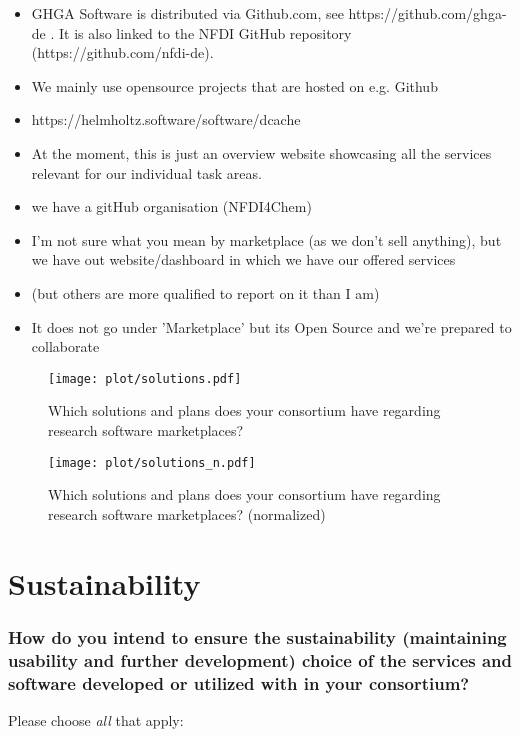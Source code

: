 \documentclass[headsepline,titlepage,twoside,12pt,toc=flat,headings=normal]{scrreprt}
\newcommand{\question}[1]{\subsubsection{#1}}
\begin{document}
\begin{itemize}
\item GHGA Software is distributed via Github.com, see https://github.com/ghga-de . It is also linked to the NFDI GitHub repository (https://github.com/nfdi-de).
\item We mainly use opensource projects that are hosted on e.g. Github
\item https://helmholtz.software/software/dcache
\item At the moment, this is just an overview website showcasing all the services relevant for our individual task areas.
\item we have a gitHub organisation (NFDI4Chem)
\item I'm not sure what you mean by marketplace (as we don't sell anything), but we have out website/dashboard in which we have our offered services
\item (but others are more qualified to report on it than I am)
\item It does not go under 'Marketplace' but its Open Source and we're prepared to collaborate
\end{itemize}

\vspace{-1em}
\begin{figure}[h!]
\caption[Solutions and plans for software marketplaces]{Which solutions and plans does your consortium have regarding research software marketplaces?}
\label{fig:solutions}
\texttt{[image: plot/solutions.pdf]}
\end{figure}

\vspace{-2em}
\begin{figure}[h!]
\caption[Solutions and plans for software marketplaces (normalized)]{Which solutions and plans does your consortium have regarding research software marketplaces? (normalized)}
\label{fig:solutions_n}
\texttt{[image: plot/solutions\_n.pdf]}
\end{figure}

\clearpage
\section{Sustainability}
\question{How do you intend to ensure the sustainability (maintaining usability and further development) choice of the services and software developed or utilized with in your consortium?}
Please choose \emph{all} that apply:
\end{document}
